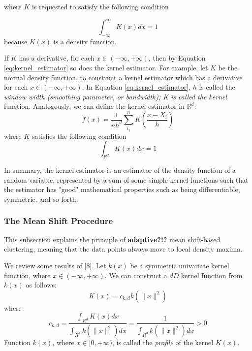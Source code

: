where $K$ is requested to satisfy the following condition

\begin{equation}\label{eq:kernel_condition}
	\int_{-\infty}^{\infty} K(x)dx = 1
\end{equation}
because $K(x)$ is a density function.

If $K$ has a derivative, for each $x \in (-\infty, +\infty)$, then by Equation
\eqref{eq:kernel_estimator} so does the kernel estimator. For example, let $K$
be the normal density function, to construct a kernel estimator which has a 
derivative for each $x \in (-\infty, +\infty)$. In Equation \eqref{eq:kernel_estimator}, $h$ is called the \emph{window width (smoothing parameter, or bandwidth); K is called the kernel} function. 
Analogously, we can define the kernel estimator in $\mathbb{R}^d$:
\begin{equation}\label{eq:kernel_estimator_rd}
	\hat{f}(x) = \frac{1}{nh^d} \sum_{i_1}^n K\left( \frac{x-X_i}{h} \right)
\end{equation} 
where $K$ satisfies the following condition
\begin{equation}\label{eq:kernel_rd_condition}
	\int_{R^d} K(x)dx = 1
\end{equation}

In summary, the kernel estimator is an estimator of the density function of a 
random variable, represented by a sum of some simple kernel functions such that
the estimator has "good" mathematical properties such as being differentiable,
symmetric, and so forth.



\subsubsection{The Mean Shift Procedure} %
\label{ssub:the_mean_shift_procedure}
This subsection explains the principle of \textbf{adaptive?!?} mean shift-based
clustering, meaning that the data points always move to local density maxima.

We review some results of [8]. Let $k(x)$ be a symmetric univariate kernel 
function, where $x \in (-\infty, +\infty)$. We can construct a $dD$ kernel 
function from $k(x)$ as follows:
\begin{equation}\label{eq:dd_kernel}
	K(x)=c_{k,d}k(\lVert x \rVert^2)
\end{equation}
where
\begin{equation}\label{eq:kernel_constant}
	c_{k,d} = \frac{\int_{R^d} K(x) dx} {\int_{R^d} k(\lVert x \rVert^2) dx} = \frac{1}{\int_{R^d} k(\lVert x \rVert^2) dx} > 0
\end{equation}
Function $k(x)$, where $x \in [0, +\infty)$, is called the \emph{profile} of the
kernel $K(x)$. 

